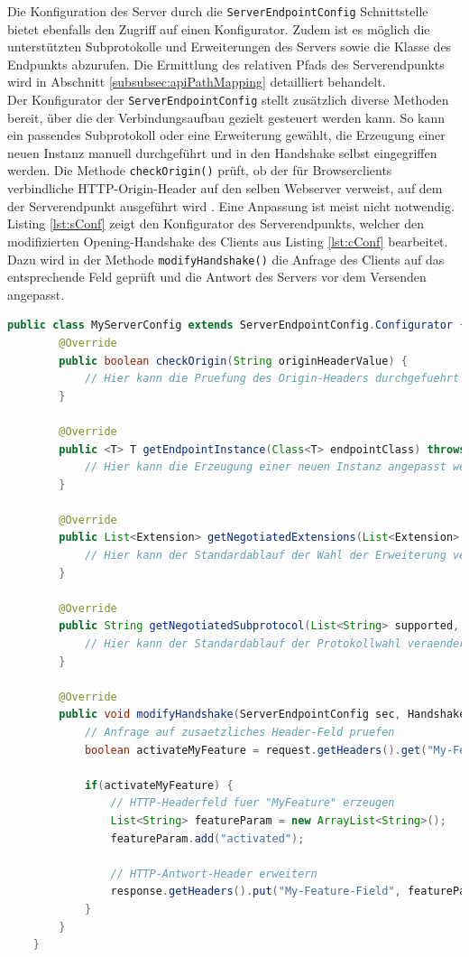 \documentclass[11pt,a4paper,titlepage]{scrartcl}
\numberwithin{equation}{section}
\begin{document}
\noindent Die Konfiguration des Server durch die \texttt{ServerEndpointConfig} Schnittstelle bietet ebenfalls den Zugriff auf einen Konfigurator. Zudem ist es möglich die unterstützten Subprotokolle und Erweiterungen des Servers sowie die Klasse des Endpunkts abzurufen. Die Ermittlung des relativen Pfads des Serverendpunkts wird in Abschnitt \ref{subsubsec:apiPathMapping} detailliert behandelt. \\

\noindent Der Konfigurator der \texttt{ServerEndpointConfig} stellt zusätzlich diverse Methoden bereit, über die der Verbindungsaufbau gezielt gesteuert werden kann. So kann ein passendes Subprotokoll oder eine Erweiterung gewählt, die Erzeugung einer neuen Instanz manuell durchgeführt und in den Handshake selbst eingegriffen werden. Die Methode \texttt{checkOrigin()} prüft, ob der für Browserclients verbindliche HTTP-Origin-Header auf den selben Webserver verweist, auf dem der Serverendpunkt ausgeführt wird \autocite[107]{coward_java_2014}. Eine Anpassung ist meist nicht notwendig. Listing \ref{lst:sConf} zeigt den Konfigurator des Serverendpunkts, welcher den modifizierten Opening-Handshake des Clients aus Listing \ref{lst:cConf} bearbeitet. Dazu wird in der Methode \texttt{modifyHandshake()} die Anfrage des Clients auf das entsprechende Feld geprüft und die Antwort des Servers vor dem Versenden angepasst. \medskip

\begin{lstlisting}[frame=single, language=Java, caption=Java: ServerEndpointConfig Konfigurationsklasse, label=lst:sConf]
	public class MyServerConfig extends ServerEndpointConfig.Configurator {
		@Override
		public boolean checkOrigin(String originHeaderValue) {
			// Hier kann die Pruefung des Origin-Headers durchgefuehrt werden
		}
		
		@Override
		public <T> T getEndpointInstance(Class<T> endpointClass) throws InstantiationException {
			// Hier kann die Erzeugung einer neuen Instanz angepasst werden
		}
		
		@Override
		public List<Extension> getNegotiatedExtensions(List<Extension> installed, List<Extension> requested) {
			// Hier kann der Standardablauf der Wahl der Erweiterung veraendert werden
		}
		
		@Override
		public String getNegotiatedSubprotocol(List<String> supported, List<String> requested) {
			// Hier kann der Standardablauf der Protokollwahl veraendert werden
		}
		
		@Override
		public void modifyHandshake(ServerEndpointConfig sec, HandshakeRequest request, HandshakeResponse response) {
			// Anfrage auf zusaetzliches Header-Feld pruefen
			boolean activateMyFeature = request.getHeaders().get("My-Feature-Field").get(0).equals("enable");
		
			if(activateMyFeature) {
				// HTTP-Headerfeld fuer "MyFeature" erzeugen
				List<String> featureParam = new ArrayList<String>();
				featureParam.add("activated");
				
				// HTTP-Antwort-Header erweitern
				response.getHeaders().put("My-Feature-Field", featureParam);
			}
		}
	}
\end{lstlisting}
\end{document}
